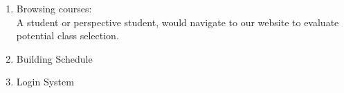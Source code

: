 
\begin{enumerate}

\item Browsing courses: \\

A student or perspective student, would navigate to our website to evaluate potential class selection.

\item Building Schedule

\item Login System


\end{enumerate}
